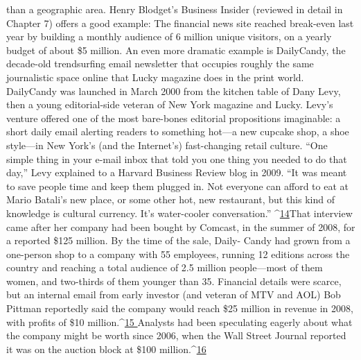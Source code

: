 than a geographic area.
Henry Blodget’s Business Insider (reviewed in detail in Chapter 7) offers a
good example: The financial news site reached break-even last year by building
a monthly audience of 6 million unique visitors, on a yearly budget of about \$5
million. An even more dramatic example is DailyCandy, the decade-old trendsurfing
email newsletter that occupies roughly the same journalistic space online
that Lucky magazine does in the print world.
DailyCandy was launched in March 2000 from the kitchen table of Dany Levy,
then a young editorial-side veteran of New York magazine and Lucky. Levy’s
venture offered one of the most bare-bones editorial propositions imaginable: a
short daily email alerting readers to something hot—a new cupcake shop, a shoe
style—in New York’s (and the Internet’s) fast-changing retail culture.
``One simple thing in your e-mail inbox that told you one thing you needed to
do that day,'' Levy explained to a Harvard Business Review blog in 2009. ``It was
meant to save people time and keep them plugged in. Not everyone can afford to
eat at Mario Batali’s new place, or some other hot, new restaurant, but this kind
of knowledge is cultural currency. It’s water-cooler conversation.'' ^{\href{#endnotes-ch3}{14}}That interview came after her company had been bought by Comcast, in the
summer of 2008, for a reported \$125 million. By the time of the sale, Daily-
Candy had grown from a one-person shop to a company with 55 employees,
running 12 editions across the country and reaching a total audience of 2.5 million
people—most of them women, and two-thirds of them younger than 35.
Financial details were scarce, but an internal email from early investor (and veteran
of MTV and AOL) Bob Pittman reportedly said the company would reach
\$25 million in revenue in 2008, with profits of \$10 million.^{\href{#endnotes-ch3}{15 }}Analysts had been
speculating eagerly about what the company might be worth since 2006, when
the Wall Street Journal reported it was on the auction block at \$100 million.^{\href{#endnotes-ch3}{16}}%


